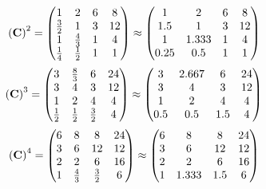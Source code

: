 \documentclass[10pt,a4paper]{article}
\begin{document}
	\[
		\left(\bold{C}\right)^{2} = 
		\begin{pmatrix}
			{1} {} & {{2}} {} & {{6}} {} & {{8}} {} \\
			\frac{{3}} {{2}} & {1} {} & {{3}} {} & {{12}} {} \\
			{1} {} & \frac{{4}} {{3}} & {1} {} & {{4}} {} \\
			\frac{1} {{4}} & \frac{1} {{2}} & {1} {} & {1} {} \\
		\end{pmatrix}
		\approx
		\begin{pmatrix}
			1        & 2        & 6        & 8        \\
			1.5      & 1        & 3        & 12       \\
			1        & 1.333    & 1        & 4        \\
			0.25     & 0.5      & 1        & 1        \\
		\end{pmatrix}
	\]
	\[
		\left(\bold{C}\right)^{3} = 
		\begin{pmatrix}
			{{3}} {} & \frac{{8}} {{3}} & {{6}} {} & {{24}} {} \\
			{{3}} {} & {{4}} {} & {{3}} {} & {{12}} {} \\
			{1} {} & {{2}} {} & {{4}} {} & {{4}} {} \\
			\frac{1} {{2}} & \frac{1} {{2}} & \frac{{3}} {{2}} & {{4}} {} \\
		\end{pmatrix}
		\approx
		\begin{pmatrix}
			3        & 2.667    & 6        & 24       \\
			3        & 4        & 3        & 12       \\
			1        & 2        & 4        & 4        \\
			0.5      & 0.5      & 1.5      & 4        \\
		\end{pmatrix}
	\]
	\[
		\left(\bold{C}\right)^{4} = 
		\begin{pmatrix}
			{{6}} {} & {{8}} {} & {{8}} {} & {{24}} {} \\
			{{3}} {} & {{6}} {} & {{12}} {} & {{12}} {} \\
			{{2}} {} & {{2}} {} & {{6}} {} & {{16}} {} \\
			{1} {} & \frac{{4}} {{3}} & \frac{{3}} {{2}} & {{6}} {} \\
		\end{pmatrix}
		\approx
		\begin{pmatrix}
			6        & 8        & 8        & 24       \\
			3        & 6        & 12       & 12       \\
			2        & 2        & 6        & 16       \\
			1        & 1.333    & 1.5      & 6        \\
		\end{pmatrix}
	\]
\end{document}
